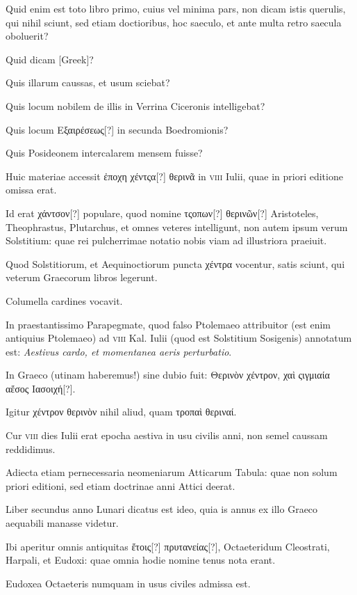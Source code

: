 \begin{parnumbers}
Quid enim est toto libro primo, cuius vel minima
pars, non dicam istis querulis, qui nihil sciunt, sed etiam doctioribus,
hoc saeculo, et ante multa retro saecula oboluerit?

Quid dicam \textgreek{[Greek]}?

Quis illarum caussas, et usum sciebat?

Quis
locum nobilem de illis in Verrina Ciceronis intelligebat?

Quis locum
\textgreek{Εξαιρέσεως[?]} in secunda Boedromionis?

Quis Posideonem intercalarem
mensem fuisse?

Huic materiae accessit \textgreek{ἐποχη χέντςα[?] θερινᾶ}
in \textsc{viii} Iulii, quae in priori editione omissa erat.

Id erat \textgreek{χάντσον[?]}
populare, quod nomine \textgreek{τςοπων[?] θερινῶν[?]} Aristoteles, Theophrastus,
Plutarchus, et omnes veteres intelligunt, non autem ipsum verum
Solstitium: quae rei pulcherrimae notatio nobis viam ad illustriora
praeiuit.

Quod Solstitiorum, et Aequinoctiorum puncta \textgreek{χέντρα} vocentur,
satis sciunt, qui veterum Graecorum libros legerunt.

Columella
cardines vocavit.

In praestantissimo Parapegmate, quod falso
Ptolemaeo attribuitor (est enim antiquius Ptolemaeo) ad \textsc{viii} Kal.
Iulii (quod est Solstitium Sosigenis) annotatum est: \textit{Aestivus cardo,
et momentanea aeris perturbatio}.

In Graeco (utinam haberemus!)
sine dubio fuit: \textgreek{Θερινὸν χέντρον, χαὶ ςιγμιαία αἔσος Ιασοιχή[?]}.

Igitur \textgreek{χέντρον
θερινὸν} nihil aliud, quam \textgreek{τροπαὶ θεριναί}.

Cur \textsc{viii} dies Iulii erat
epocha aestiva in usu civilis anni, non semel caussam reddidimus. 

Adiecta etiam pernecessaria neomeniarum Atticarum Tabula: quae
non solum priori editioni, sed etiam doctrinae anni Attici deerat.

Liber secundus anno Lunari dicatus est ideo, quia is annus ex illo
Graeco aequabili manasse videtur.

Ibi aperitur omnis antiquitas \textgreek{ἔτοις[?]
πρυτανείας[?]}, Octaeteridum Cleostrati, Harpali, et Eudoxi: quae omnia
hodie nomine tenus nota erant.

Eudoxea Octaeteris numquam
in usus civiles admissa est.


\end{parnumbers}
